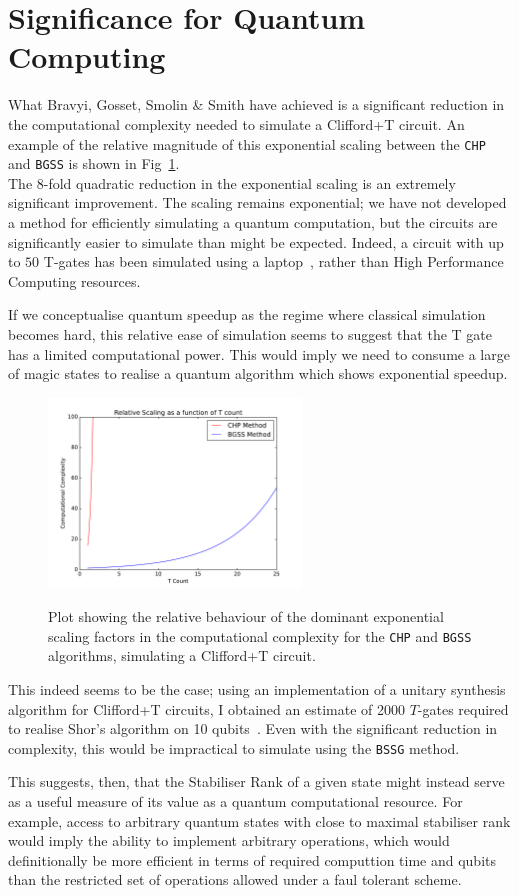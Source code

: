 \documentclass{standalone}
\begin{document}
\section{Significance for Quantum Computing}
What Bravyi, Gosset, Smolin \& Smith have achieved is a significant reduction in the computational complexity needed to simulate a Clifford+T circuit. An example of the relative magnitude of this exponential scaling between the \texttt{CHP} and \texttt{BGSS} is shown in Fig~\ref{fig:quadraticreduction}. \\
The 8-fold quadratic reduction in the exponential scaling is an extremely significant improvement. The scaling remains exponential; we have not developed a method for efficiently simulating a quantum computation, but the circuits are significantly easier to simulate than might be expected. Indeed, a circuit with up to $50$ T-gates has been simulated using a laptop~\cite{Bravyi2015}, rather than High Performance Computing resources. 
\par
If we conceptualise quantum speedup as the regime where classical simulation becomes hard, this relative ease of simulation seems to suggest that the T gate has a limited computational power. This would imply we need to consume a large of magic states to realise a quantum algorithm which shows exponential speedup.\\
\begin{figure}[ht]
    \centering
    \includegraphics[width=0.6\textwidth]{Figures/tcount.pdf}
\label{fig:quadraticreduction}
\caption{Plot showing the relative behaviour of the dominant exponential scaling factors in the computational complexity for the \texttt{CHP} and \texttt{BGSS} algorithms, simulating a Clifford+T circuit.}
\end{figure}
This indeed seems to be the case; using an implementation of a unitary synthesis algorithm for Clifford+T circuits, I obtained an estimate of 2000 $T$-gates required to realise Shor's algorithm on 10 qubits~\cite{Selinger2012}. Even with the significant reduction in complexity, this would be impractical to simulate using the \texttt{BSSG} method. 
\par
This suggests, then, that the Stabiliser Rank of a given state might instead serve as a useful measure of its value as a quantum computational resource. For example, access to arbitrary quantum states with close to maximal stabiliser rank would imply the ability to implement arbitrary operations, which would definitionally be more efficient in terms of required computtion time and qubits than the restricted set of operations allowed under a faul tolerant scheme. 
\end{document}
